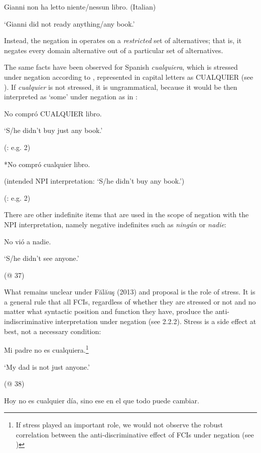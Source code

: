   Gianni non ha letto niente/nessun libro.  (Italian)

  ‘Gianni did not ready anything/any book.’

Instead, the negation in  operates on a \textit{restricted} set of alternatives; that is, it negates every domain alternative out of a particular set of alternatives.

  The same facts have been observed for Spanish \textit{cualquiera}, which is stressed under negation according to \citet{Arregui2006}, represented in capital letters as CUALQUIER (see \citealt{Arregui2006}). If \textit{cualquier} is not stressed, it is ungrammatical, because it would be then interpreted as ‘some’ under negation as in :

  No compró \MakeUppercase{cualquier} libro.

  ‘S/he didn't buy just any book.’

  (\citealt{Arregui2006}: e.g. 2)

\label{bkm:Ref533953565}  *No compró cualquier libro.

  (intended NPI interpretation: ‘S/he didn’t buy any book.’) 

  (\citealt{Arregui2006}: e.g. 2)

There are other indefinite items that are used in the scope of negation with the NPI interpretation, namely negative indefinites such as \textit{ningún} or \textit{nadie}:

  No vió a nadie.

  ‘S/he didn’t see anyone.’

  (@ 37)

What remains unclear under Fălăuş (2013) and  proposal is the role of stress. It is a general rule that all FCIs, regardless of whether they are stressed or not and no matter what syntactic position and function they have, produce the anti-indiscriminative interpretation under negation (see 2.2.2). Stress is a side effect at best, not a necessary condition:

\label{bkm:Ref42806294}  Mi padre no es cualquiera.\footnote{If stress played an important role, we would not observe the robust correlation between the anti-discriminative effect of FCIs under negation (see )} 

  ‘My dad is not just anyone.’

  (@ 38)

\label{bkm:Ref42806303}  Hoy no es cualquier día, sino ese en el que todo puede cambiar.


